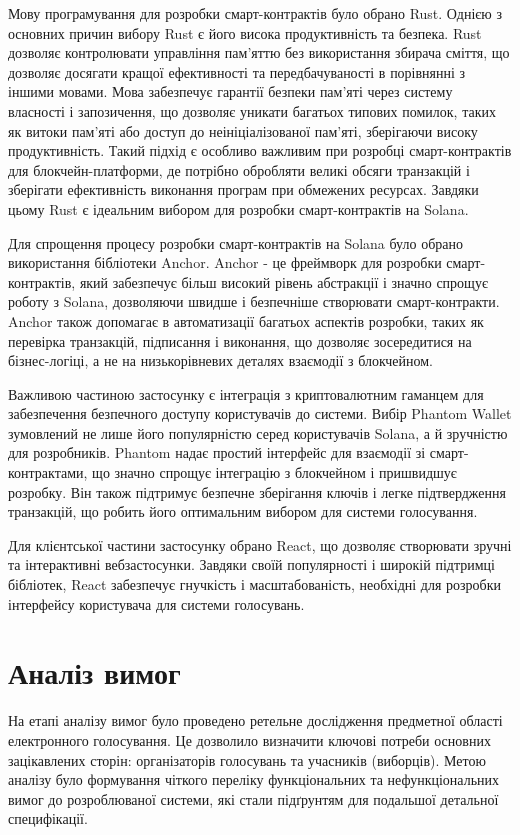 \documentclass[14pt]{extreport}
\begin{document}
  Мову програмування для розробки смарт-контрактів було обрано Rust. Однією з основних причин вибору Rust є його висока продуктивність та безпека. Rust дозволяє контролювати управління пам'яттю без використання збирача сміття, що дозволяє досягати кращої ефективності та передбачуваності в порівнянні з іншими мовами. Мова забезпечує гарантії безпеки пам'яті через систему власності і запозичення, що дозволяє уникати багатьох типових помилок, таких як витоки пам'яті або доступ до неініціалізованої пам'яті, зберігаючи високу продуктивність. Такий підхід є особливо важливим при розробці смарт-контрактів для блокчейн-платформи, де потрібно обробляти великі обсяги транзакцій і зберігати ефективність виконання програм при обмежених ресурсах. Завдяки цьому Rust є ідеальним вибором для розробки смарт-контрактів на Solana.

  Для спрощення процесу розробки смарт-контрактів на Solana було обрано використання бібліотеки Anchor. Anchor - це фреймворк для розробки смарт-контрактів, який забезпечує більш високий рівень абстракції і значно спрощує роботу з Solana, дозволяючи швидше і безпечніше створювати смарт-контракти. Anchor також допомагає в автоматизації багатьох аспектів розробки, таких як перевірка транзакцій, підписання і виконання, що дозволяє зосередитися на бізнес-логіці, а не на низькорівневих деталях взаємодії з блокчейном.

  Важливою частиною застосунку є інтеграція з криптовалютним гаманцем для забезпечення безпечного доступу користувачів до системи. Вибір Phantom Wallet зумовлений не лише його популярністю серед користувачів Solana, а й зручністю для розробників. Phantom надає простий інтерфейс для взаємодії зі смарт-контрактами, що значно спрощує інтеграцію з блокчейном і пришвидшує розробку. Він також підтримує безпечне зберігання ключів і легке підтвердження транзакцій, що робить його оптимальним вибором для системи голосування.

  Для клієнтської частини застосунку обрано React, що дозволяє створювати зручні та інтерактивні вебзастосунки. Завдяки своїй популярності і широкій підтримці бібліотек, React забезпечує гнучкість і масштабованість, необхідні для розробки інтерфейсу користувача для системи голосувань.
  
  \section{Аналіз вимог}
  
  На етапі аналізу вимог було проведено ретельне дослідження предметної області електронного голосування. Це дозволило визначити ключові потреби основних зацікавлених сторін: організаторів голосувань та учасників (виборців). Метою аналізу було формування чіткого переліку функціональних та нефункціональних вимог до розроблюваної системи, які стали підґрунтям для подальшої детальної специфікації.
  
\end{document}
